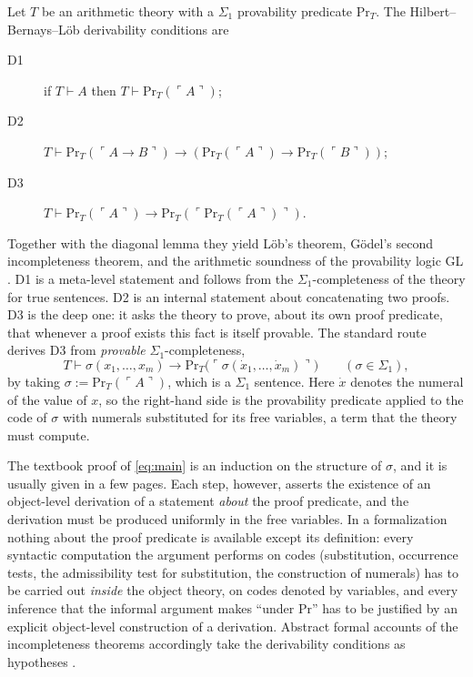 \documentclass[11pt]{article}
\theoremstyle{plain}
\theoremstyle{definition}
\theoremstyle{remark}
\newcommand{\Prv}{\mathrm{Pr}}
\newcommand{\gn}[1]{\ulcorner #1 \urcorner}
\begin{document}
Let $T$ be an arithmetic theory with a $\Sigma_1$ provability predicate
$\Prv_T$.  The Hilbert--Bernays--L\"ob derivability conditions
\cite{HilbertBernays1939,Loeb1955} are
\begin{description}
  \item[D1] if $T \vdash A$ then $T \vdash \Prv_T(\gn{A})$;
  \item[D2] $T \vdash \Prv_T(\gn{A \to B}) \to (\Prv_T(\gn{A}) \to \Prv_T(\gn{B}))$;
  \item[D3] $T \vdash \Prv_T(\gn{A}) \to \Prv_T(\gn{\Prv_T(\gn{A})})$.
\end{description}
Together with the diagonal lemma they yield L\"ob's theorem, G\"odel's
second incompleteness theorem, and the arithmetic soundness of the
provability logic GL \cite{Boolos1993,Smorynski1985}.  D1 is a meta-level
statement and follows from the $\Sigma_1$-completeness of the theory for
true sentences.  D2 is an internal statement about concatenating two
proofs.  D3 is the deep one: it asks the theory to prove, about its own
proof predicate, that whenever a proof exists this fact is itself
provable.  The standard route \cite{Boolos1993,HajekPudlak1993} derives
D3 from \emph{provable} $\Sigma_1$-completeness,
\begin{equation}\label{eq:main}
  T \vdash \sigma(x_1,\dots,x_m) \to
  \Prv_T\bigl(\gn{\sigma(\dot x_1,\dots,\dot x_m)}\bigr)
  \qquad (\sigma \in \Sigma_1),
\end{equation}
by taking $\sigma := \Prv_T(\gn{A})$, which is a $\Sigma_1$ sentence.
Here $\dot x$ denotes the numeral of the value of $x$, so the right-hand
side is the provability predicate applied to the code of $\sigma$ with
numerals substituted for its free variables, a term that the theory must
compute.

The textbook proof of \eqref{eq:main} is an induction on the structure of
$\sigma$, and it is usually given in a few pages.  Each step, however,
asserts the existence of an object-level derivation of a statement
\emph{about} the proof predicate, and the derivation must be produced
uniformly in the free variables.  In a formalization nothing about the
proof predicate is available except its definition: every syntactic
computation the argument performs on codes (substitution, occurrence
tests, the admissibility test for substitution, the construction of
numerals) has to be carried out \emph{inside} the object theory, on
codes denoted by variables, and every inference that the informal
argument makes ``under $\Prv$'' has to be justified by an explicit
object-level construction of a derivation.  Abstract formal accounts of
the incompleteness theorems accordingly take the derivability conditions
as hypotheses \cite{PopescuTraytel2019}.
\end{document}
